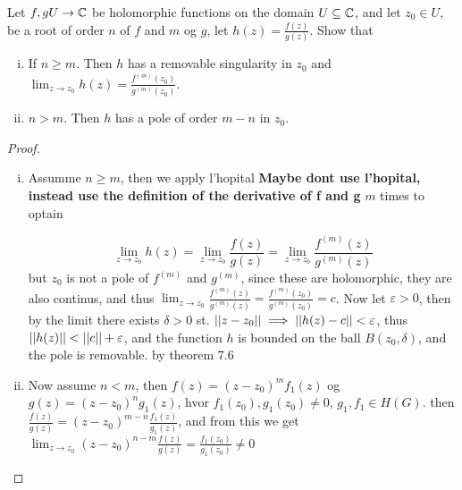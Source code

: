 \begin{exercise}
Let $f, g U \to \mathbb{C}$ be holomorphic functions on the domain $U \subseteq \mathbb{C}$, and let $z_{0} \in U$, be a root of order $n$ of $f$ and $m$ og $g$, let $h(z) = \frac{f(z)}{g(z)}$. Show that \begin{enumerate}[i)]
\item If $n \geq m$. Then $h$ has a removable singularity in $z_{0}$ and $\lim_{z \to z_{0}} h(z) = \frac{f^{(m)}(z_{0})}{g^{(m)}(z_{0})}$.

\item $n > m$. Then $h$ has a pole of order $m - n$ in $z_{0}$.
\end{enumerate}
\end{exercise}
\begin{proof}
\begin{enumerate}[i)]
  \item Assumme $n \geq m$, then we apply l'hopital \textbf{Maybe dont use l'hopital, instead use the definition of the derivative of f and g} $m$ times to optain

\begin{equation*}
  \lim_{z \to z_{0}} h(z) = \lim_{z \to z_{0}} \frac{f(z)}{g(z)} = \lim_{z \to z_{0}} \frac{f^{(m)}(z)}{g^{(m)}(z)}
\end{equation*}
        but $z_{0}$ is not a pole of $f^{(m)}$ and $g^{(m)}$, since these are holomorphic, they are also continus, and thus $\lim_{z \to z_{0}} \frac{f^{(m)}(z)}{g^{(m)}(z)} =\frac{f^{(m)}(z_{0})}{g^{(m)}(z_{0})} = c$. Now let $\varepsilon > 0$, then by the limit there exists $\delta > 0$ st. $\lvert\lvert z - z_{0}\rvert\rvert \implies \lvert\lvert h(z) - c\rvert\rvert < \varepsilon$, thus $\lvert\lvert h(z)\rvert\rvert < \lvert\lvert c\rvert\rvert + \varepsilon$, and the function $h$ is bounded on the ball $B(z_{0}, \delta)$, and the pole is removable. by theorem 7.6
        \item Now assume $n < m$, then $f(z) = (z - z_{0})^{m} f_{1}(z)$ og $g(z) = (z - z_{0})^{n} g_{1}(z)$, hvor $f_{1}(z_{0}), g_{1}(z_{0}) \neq 0$, $g_{1}, f_{1} \in H(G)$. then $\frac{f(z)}{g(z)} = (z-z_{0})^{m - n} \frac{f_{1}(z)}{g_{1}(z)}$, and from this we get $\lim_{z \to z_{0}} (z - z_{0})^{n - m} \frac{f(z)}{g(z)} = \frac{f_{1}(z_{0})}{g_{1}(z_{0})} \neq 0$
\end{enumerate}
\end{proof}
